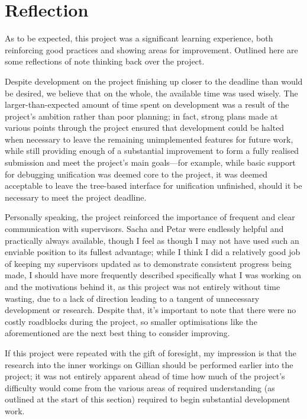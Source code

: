 \section{Reflection}

As to be expected, this project was a significant learning experience, both
reinforcing good practices and showing areas for improvement. Outlined here are
some reflections of note thinking back over the project.

Despite development on the project finishing up closer to the deadline than
would be desired, we believe that on the whole, the available time was used
wisely. The larger-than-expected amount of time spent on development was a
result of the project's ambition rather than poor planning; in fact, strong
plans made at various points through the project ensured that development could
be halted when necessary to leave the remaining unimplemented features for
future work, while still providing enough of a substantial improvement to form
a fully realised submission and meet the project's main goals---for example,
while basic support for debugging unification was deemed core to the project,
it was deemed acceptable to leave the tree-based interface for unification
unfinished, should it be necessary to meet the project deadline.

Personally speaking, the project reinforced the importance of frequent and clear
communication with supervisors. Sacha and Petar were endlessly helpful and
practically always available, though I feel as though I may not have used such
an enviable position to its fullest advantage; while I think I did a relatively
good job of keeping my supervisors updated as to demonstrate consistent progress
being made, I should have more frequently described specifically what I was
working on and the motivations behind it, as this project was not entirely
without time wasting, due to a lack of direction leading to a tangent of
unnecessary development or research. Despite that, it's important to note that
there were no costly roadblocks during the project, so smaller optimisations
like the aforementioned are the next best thing to consider improving.

If this project were repeated with the gift of foresight, my impression is that the research into the inner workings on Gillian should be performed earlier into the project;
it was not entirely apparent ahead of time how much of the project's difficulty
would come from the various areas of required understanding (as outlined at the start of this section) required to begin substantial development work.
